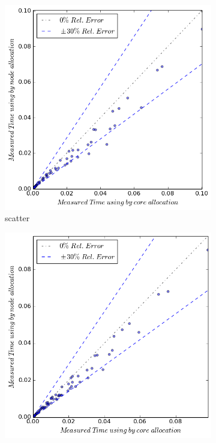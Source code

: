 \begin{figure}[ht]
    \centering
    \begin{subfigure}[b]{0.40\textwidth}
        \includegraphics[width=\textwidth]{./images/bycore_vs_bynode/scatter.png}
        \caption{scatter}
    \end{subfigure}
    \quad 
     \begin{subfigure}[b]{0.40\textwidth}
        \includegraphics[width=\textwidth]{./images/bycore_vs_bynode/gather.png}

\end{subfigure}
\end{figure}
